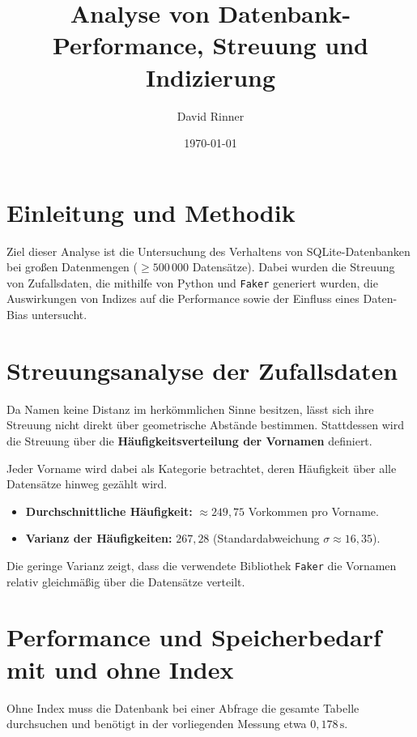 \documentclass{article}
\begin{document}
\title{Analyse von Datenbank-Performance, Streuung und Indizierung}
\author{David Rinner}
\date{\today}

\maketitle

\section{Einleitung und Methodik}

Ziel dieser Analyse ist die Untersuchung des Verhaltens von
SQLite-Datenbanken bei großen Datenmengen ($\geq 500\,000$ Datensätze).
Dabei wurden die Streuung von Zufallsdaten, die mithilfe von Python und
\texttt{Faker} generiert wurden, die Auswirkungen von Indizes auf die
Performance sowie der Einfluss eines Daten-Bias untersucht.

\section{Streuungsanalyse der Zufallsdaten}

Da Namen keine Distanz im herkömmlichen Sinne besitzen, lässt sich ihre
Streuung nicht direkt über geometrische Abstände bestimmen.
Stattdessen wird die Streuung über die \textbf{Häufigkeitsverteilung der
Vornamen} definiert.

Jeder Vorname wird dabei als Kategorie betrachtet, deren Häufigkeit über
alle Datensätze hinweg gezählt wird.

\begin{itemize}
    \item \textbf{Durchschnittliche Häufigkeit:} $\approx 249{,}75$
    Vorkommen pro Vorname.
    
    \item \textbf{Varianz der Häufigkeiten:} $267{,}28$
    (Standardabweichung $\sigma \approx 16{,}35$).
\end{itemize}

Die geringe Varianz zeigt, dass die verwendete Bibliothek
\texttt{Faker} die Vornamen relativ gleichmäßig über die Datensätze
verteilt.

\section{Performance und Speicherbedarf mit und ohne Index}

Ohne Index muss die Datenbank bei einer Abfrage 
die gesamte Tabelle durchsuchen und benötigt in der vorliegenden
Messung etwa $0{,}178\,\mathrm{s}$.
\end{document}
